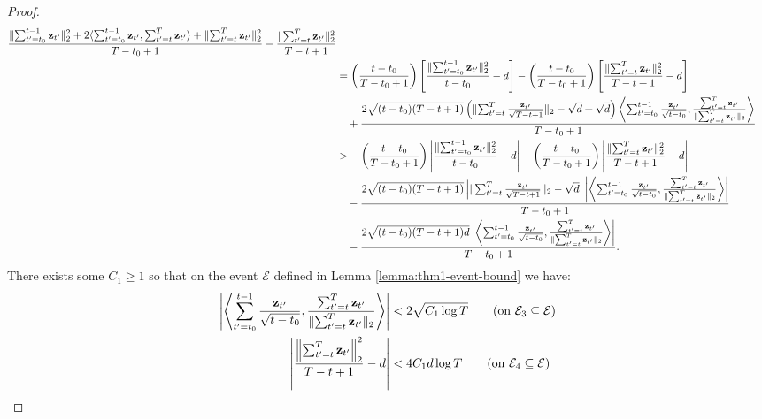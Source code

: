 \begin{proof}
\begin{align}
    \frac{\lVert\sum_{t'=t_0}^{t-1}\mathbf{z}_{t'}\rVert_2^2 + 2\langle \sum_{t'=t_0}^{t-1}\mathbf{z}_{t'}, \sum_{t'=t}^{T}\mathbf{z}_{t'}\rangle + \lVert\sum_{t'=t}^{T}\mathbf{z}_{t'}\rVert_2^2}{T-t_0+1}  - \frac{\lVert\sum_{t'=t}^T\mathbf{z}_{t'}\rVert_2^2}{T-t+1} \notag \\
    &= \left(\frac{t-t_0}{T-t_0+1}\right)\left[\frac{\lVert\sum_{t'=t_0}^{t-1}\mathbf{z}_{t'}\rVert_2^2}{t-t_0} - d\right] - \left(\frac{t-t_0}{T-t_0+1}\right)\left[\frac{\lVert\sum_{t'=t}^T\mathbf{z}_{t'}\rVert_2^2}{T-t+1} -d \right] \notag \\
    &\quad +\frac{2\sqrt{(t-t_0)(T-t+1)}\left(\lVert\sum_{t'=t}^{T}\frac{\mathbf{z}_{t'}}{\sqrt{T-t+1}}\rVert_2 -\sqrt{d} + \sqrt{d}\right)\left\langle \sum_{t'=t_0}^{t-1}\frac{\mathbf{z}_{t'}}{\sqrt{t-t_0}}, \frac{\sum_{t'=t}^{T}\mathbf{z}_{t'}}{\lVert\sum_{t'=t}^{T}\mathbf{z}_{t'}\rVert_2}\right\rangle}{T-t_0+1} \notag \\
    &> -\left(\frac{t-t_0}{T-t_0+1}\right)\left|\frac{\lVert\sum_{t'=t_0}^{t-1}\mathbf{z}_{t'}\rVert_2^2}{t-t_0} - d\right| - \left(\frac{t-t_0}{T-t_0+1}\right)\left|\frac{\lVert\sum_{t'=t}^T\mathbf{z}_{t'}\rVert_2^2}{T-t+1} -d \right| \notag \\
    &\quad -\frac{2\sqrt{(t-t_0)(T-t+1)}\left|\lVert\sum_{t'=t}^{T}\frac{\mathbf{z}_{t'}}{\sqrt{T-t+1}}\rVert_2 -\sqrt{d}\right|\left|\left\langle \sum_{t'=t_0}^{t-1}\frac{\mathbf{z}_{t'}}{\sqrt{t-t_0}}, \frac{\sum_{t'=t}^{T}\mathbf{z}_{t'}}{\lVert\sum_{t'=t}^{T}\mathbf{z}_{t'}\rVert_2}\right\rangle\right|}{T-t_0+1} \notag \\
    &\quad-\frac{2\sqrt{(t-t_0)(T-t+1)d}\left|\left\langle \sum_{t'=t_0}^{t-1}\frac{\mathbf{z}_{t'}}{\sqrt{t-t_0}}, \frac{\sum_{t'=t}^{T}\mathbf{z}_{t'}}{\lVert\sum_{t'=t}^{T}\mathbf{z}_{t'}\rVert_2}\right\rangle\right|}{T-t_0+1}. \label{eq:thm1-bd2}
\end{align}
\normalsize
There exists some $C_1 \geq 1$ so that on the event $\mathcal{E}$ defined in Lemma \ref{lemma:thm1-event-bound} we have:
\begin{align*}
    \left|\left\langle \sum_{t'=t_0}^{t-1}\frac{\mathbf{z}_{t'}}{\sqrt{t-t_0}}, \frac{\sum_{t'=t}^{T}\mathbf{z}_{t'}}{\lVert\sum_{t'=t}^{T}\mathbf{z}_{t'}\rVert_2}\right\rangle\right| &< 2\sqrt{C_1\log T} \tag{on $\mathcal{E}_3\subseteq\mathcal{E}$} \\
    \left|\frac{\left\lVert\sum_{t'=t}^T\mathbf{z}_{t'}\right\rVert_2^2}{T-t+1} - d\right| &< 4C_1d\log T \tag{on $\mathcal{E}_4\subseteq\mathcal{E}$} \\

\end{align*}
\end{proof}
